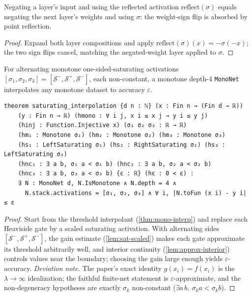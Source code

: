 \begin{proposition}\label{prop:sign-sat}
  \leanok
  Negating a layer's input and using the reflected activation $\mathrm{reflect}(\sigma)$ equals
  negating the next layer's weights and using $\sigma$: the weight-sign flip is absorbed by point
  reflection.
\end{proposition}
\begin{proof}\leanok
  Expand both layer compositions and apply $\mathrm{reflect}(\sigma)(x)=-\sigma(-x)$; the two
  sign flips cancel, matching the negated-weight layer applied to $\sigma$.
\end{proof}

\begin{theorem}\label{thm:sat-interp}
  \leanok
  For alternating monotone one-sided-saturating activations
  $[\sigma_1,\sigma_2,\sigma_3]=[\mathcal{S}^-,\mathcal{S}^+,\mathcal{S}^-]$, each non-constant,
  a monotone depth-4 \texttt{MonoNet} interpolates any monotone dataset to accuracy
  $\varepsilon$.
\end{theorem}
\begin{verbatim}
theorem saturating_interpolation {d n : ℕ} (x : Fin n → (Fin d → ℝ))
    (y : Fin n → ℝ) (hmono : ∀ i j, x i ≤ x j → y i ≤ y j)
    (hinj : Function.Injective x) (σ₁ σ₂ σ₃ : ℝ → ℝ)
    (hm₁ : Monotone σ₁) (hm₂ : Monotone σ₂) (hm₃ : Monotone σ₃)
    (hs₁ : LeftSaturating σ₁) (hs₂ : RightSaturating σ₂) (hs₃ : LeftSaturating σ₃)
    (hnc₁ : ∃ a b, σ₁ a < σ₁ b) (hnc₂ : ∃ a b, σ₂ a < σ₂ b)
    (hnc₃ : ∃ a b, σ₃ a < σ₃ b) {ε : ℝ} (hε : 0 < ε) :
    ∃ N : MonoNet d, N.IsMonotone ∧ N.depth = 4 ∧
      N.stack.activations = [σ₁, σ₂, σ₃] ∧ ∀ i, |N.toFun (x i) - y i| ≤ ε
\end{verbatim}
\begin{proof}\leanok
  Start from the threshold interpolant (\cref{thm:mono-interp}) and replace each Heaviside gate by
  a scaled saturating activation. With alternating sides $[\mathcal{S}^-,\mathcal{S}^+,
  \mathcal{S}^-]$, the gain estimate (\cref{lem:sat-scaled}) makes each gate approximate its
  threshold arbitrarily well, and interior continuity (\cref{lem:approx-interior}) controls values
  near the boundary; choosing the gain large enough yields $\varepsilon$-accuracy.
  \emph{Deviation note.} The paper's exact identity $g(x_i)=f(x_i)$ is the $\lambda\to\infty$
  idealization; the faithful finite-net statement is $\varepsilon$-approximate, and the
  non-degeneracy hypotheses are exactly $\sigma_k$ non-constant ($\exists a\,b,\ \sigma_k a <
  \sigma_k b$).
\end{proof}

